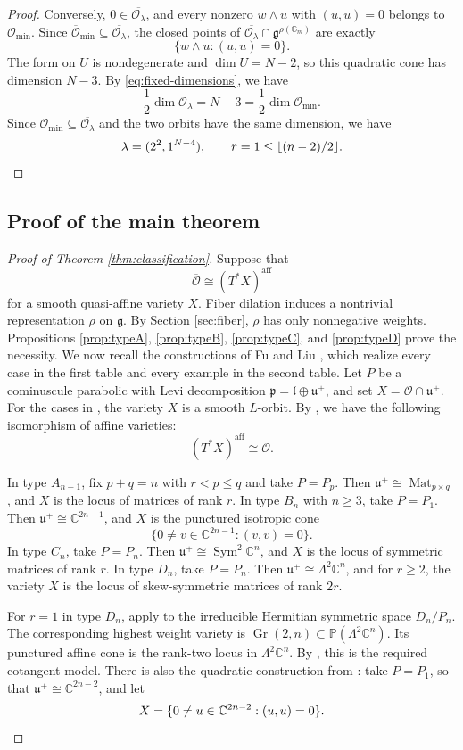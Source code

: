 \documentclass[10pt,a4paper]{amsart}
\DeclareMathOperator{\Sym}{Sym}
\DeclareMathOperator{\Mat}{Mat}
\newcommand{\C}{\mathbb C}
\newcommand{\Gm}{\mathbb G_m}
\newcommand{\PP}{\mathbb P}
\newcommand{\aff}{\mathrm{aff}}
\begin{document}
\begin{proof}
Conversely, $0\in\overline{\mathcal O_\lambda}$, and every nonzero
$w\wedge u$ with $(u,u)=0$ belongs to $\mathcal O_{\min}$.
Since
$\overline{\mathcal O}_{\min}\subseteq
\overline{\mathcal O_\lambda}$, the closed points of
$\overline{\mathcal O_\lambda}\cap\mathfrak g^{\rho(\Gm)}$ are
exactly
\[
\{w\wedge u:(u,u)=0\}.
\]
The form on $U$ is nondegenerate and $\dim U=N-2$, so this quadratic
cone has dimension $N-3$. By \eqref{eq:fixed-dimensions}, we have
\[
\frac12\dim\mathcal O_\lambda=N-3
=\frac12\dim\mathcal O_{\min}.
\]
Since $\mathcal O_{\min}\subseteq\overline{\mathcal O_\lambda}$ and
the two orbits have the same dimension, we have
\[
\lambda=(2^2,1^{N-4}),
\qquad
r=1\leq\lfloor(n-2)/2\rfloor.\qedhere
\]
\end{proof}

\subsection{Proof of the main theorem}\label{sec:mainproof}


\begin{proof}[Proof of Theorem \ref{thm:classification}]
Suppose that
\[
\overline{\mathcal O}\cong(T^*X)^{\aff}
\]
for a smooth quasi-affine variety $X$.
Fiber dilation induces a nontrivial representation $\rho$ on
$\mathfrak g$. By Section \ref{sec:fiber}, $\rho$ has only nonnegative
weights.
Propositions \ref{prop:typeA}, \ref{prop:typeB}, \ref{prop:typeC},
and \ref{prop:typeD} prove the necessity.
We now recall the constructions of Fu and Liu \cite{FuLiu}, which
realize every case in the first table and every example in the second
table.
Let $P$ be a cominuscule parabolic with Levi decomposition
$\mathfrak p=\mathfrak l\oplus\mathfrak u^+$, and set
$X=\mathcal O\cap\mathfrak u^+$.
For the cases in \cite[Table 1]{FuLiu}, the variety $X$ is a smooth
$L$-orbit. By \cite[Theorem 4.2]{FuLiu}, we have the following
isomorphism of affine varieties:
\[
(T^*X)^{\aff}\cong\overline{\mathcal O}.
\]

In type $A_{n-1}$, fix $p+q=n$ with $r<p\leq q$ and take $P=P_p$.
Then $\mathfrak u^+\cong\Mat_{p\times q}$, and $X$ is the locus of
matrices of rank $r$.
In type $B_n$ with $n\geq3$, take $P=P_1$. Then
$\mathfrak u^+\cong\C^{2n-1}$, and $X$ is the punctured isotropic cone
\[
\{0\ne v\in\C^{2n-1}:(v,v)=0\}.
\]
In type $C_n$, take $P=P_n$. Then
$\mathfrak u^+\cong\Sym^2\C^n$, and $X$ is the locus of symmetric
matrices of rank $r$. In type $D_n$, take $P=P_n$. Then
$\mathfrak u^+\cong\Lambda^2\C^n$, and for $r\geq2$, the variety $X$
is the locus of skew-symmetric matrices of rank $2r$.

For $r=1$ in type $D_n$, apply \cite[Theorem 1.4]{FuLiu} to the
irreducible Hermitian symmetric space $D_n/P_n$.
The corresponding highest weight variety is
$\operatorname{Gr}(2,n)\subset\PP(\Lambda^2\C^n)$.
Its punctured affine cone is the rank-two locus in $\Lambda^2\C^n$.
By \cite[Theorem 1.4]{FuLiu}, this is the required cotangent model.
There is also the quadratic construction from
\cite[Table 1 and Theorem 4.2]{FuLiu}: take $P=P_1$, so that
$\mathfrak u^+\cong\C^{2n-2}$, and let
\[
X=\{0\ne u\in\C^{2n-2}:(u,u)=0\}.\qedhere
\]
\end{proof}
\end{document}
